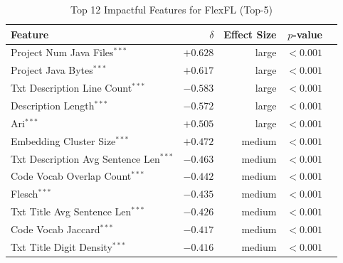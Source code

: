\begin{table}[h]
\centering
\caption{Top 12 Impactful Features for FlexFL (Top-5)}
\label{tab:tool_features_flexfl_top5}
\begin{tabular}{lrrrr}
\toprule
Feature & $\delta$ & Effect Size & $p$-value \\
\midrule
Project Num Java Files$^{***}$ & $+0.628$ & large & $<0.001$ \\
Project Java Bytes$^{***}$ & $+0.617$ & large & $<0.001$ \\
Txt Description Line Count$^{***}$ & $-0.583$ & large & $<0.001$ \\
Description Length$^{***}$ & $-0.572$ & large & $<0.001$ \\
Ari$^{***}$ & $+0.505$ & large & $<0.001$ \\
Embedding Cluster Size$^{***}$ & $+0.472$ & medium & $<0.001$ \\
Txt Description Avg Sentence Len$^{***}$ & $-0.463$ & medium & $<0.001$ \\
Code Vocab Overlap Count$^{***}$ & $-0.442$ & medium & $<0.001$ \\
Flesch$^{***}$ & $-0.435$ & medium & $<0.001$ \\
Txt Title Avg Sentence Len$^{***}$ & $-0.426$ & medium & $<0.001$ \\
Code Vocab Jaccard$^{***}$ & $-0.417$ & medium & $<0.001$ \\
Txt Title Digit Density$^{***}$ & $-0.416$ & medium & $<0.001$ \\
\bottomrule
\end{tabular}
\end{table}

